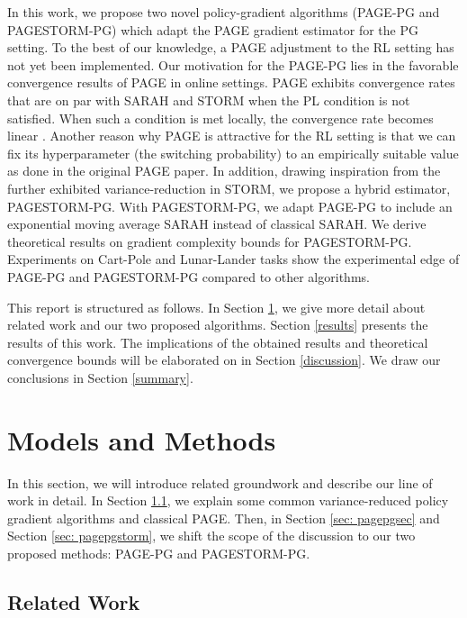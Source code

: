 \documentclass[10pt,twocolumn,letterpaper]{article}
\begin{document}
In this work, we propose two novel policy-gradient algorithms (PAGE-PG and PAGESTORM-PG) which adapt the PAGE gradient estimator for the PG setting. To the best of our knowledge, a PAGE adjustment to the RL setting has not yet been implemented. Our motivation for the PAGE-PG lies in the favorable convergence results of PAGE in online settings. PAGE exhibits convergence rates that are on par with SARAH and STORM when the PL condition is not satisfied. When such a condition is met locally, the convergence rate becomes linear \cite{pagepaper}.  Another reason why PAGE is attractive for the RL setting is that we can fix its hyperparameter (the switching probability) to an empirically suitable value as done in the original PAGE paper.  In addition, drawing inspiration from the further exhibited variance-reduction in STORM, we propose a hybrid estimator, PAGESTORM-PG. With PAGESTORM-PG, we adapt PAGE-PG to include an exponential moving average SARAH instead of classical SARAH. We derive theoretical results on gradient complexity bounds for PAGESTORM-PG. Experiments on Cart-Pole and Lunar-Lander tasks show the experimental edge of PAGE-PG and PAGESTORM-PG compared to other algorithms. 

This report is structured as follows. In Section \ref{models}, we give more detail about related work and our two proposed algorithms. Section \ref{results} presents the results of this work. The implications of the obtained results and theoretical convergence bounds will be elaborated on in Section \ref{discussion}. We draw our conclusions in Section \ref{summary}. 

\section{Models and Methods} \label{models}

In this section, we will introduce related groundwork and describe our line of work in detail. In Section \ref{relatedwork}, we explain some common variance-reduced policy gradient algorithms and classical PAGE. Then, in Section \ref{sec: pagepgsec} and Section \ref{sec: pagepgstorm}, we shift the scope of the discussion to our two proposed methods: PAGE-PG and PAGESTORM-PG.

\subsection{Related Work} \label{relatedwork}
\end{document}
